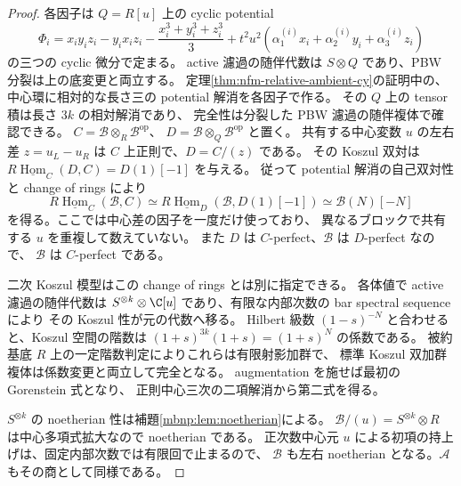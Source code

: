 \begin{proof}
各因子は $Q=R[u]$ 上の cyclic potential
\[
 \Phi_i=x_iy_iz_i-y_ix_iz_i
       -\frac{x_i^3+y_i^3+z_i^3}{3}
       +t^2u^2\left(\alpha^{(i)}_1x_i+
                     \alpha^{(i)}_2y_i+\alpha^{(i)}_3z_i\right)
\]
の三つの cyclic 微分で定まる。
active 濾過の随伴代数は $S\otimes Q$ であり、PBW 分裂は上の底変更と両立する。
定理\ref{thm:nfm-relative-ambient-cy}の証明中の、
中心環に相対的な長さ三の potential 解消を各因子で作る。
その $Q$ 上の tensor 積は長さ $3k$ の相対解消であり、
完全性は分裂した PBW 濾過の随伴複体で確認できる。
$C=\mathscr B\otimes_R\mathscr B^{\mathrm{op}}$、
$D=\mathscr B\otimes_Q\mathscr B^{\mathrm{op}}$ と置く。
共有する中心変数 $u$ の左右差 $z=u_L-u_R$ は $C$ 上正則で、$D=C/(z)$ である。
その Koszul 双対は
$R\underline{\operatorname{Hom}}_C(D,C)=D(1)[-1]$ を与える。
従って potential 解消の自己双対性と change of rings により
\[
 R\underline{\operatorname{Hom}}_C(\mathscr B,C)
 \simeq R\underline{\operatorname{Hom}}_D
              (\mathscr B,D(1)[-1])
 \simeq\mathscr B(N)[-N]
\]
を得る。ここでは中心差の因子を一度だけ使っており、
異なるブロックで共有する $u$ を重複して数えていない。
また $D$ は $C$-perfect、$\mathscr B$ は $D$-perfect なので、
$\mathscr B$ は $C$-perfect である。

二次 Koszul 模型はこの change of rings とは別に指定できる。
各体値で active 濾過の随伴代数は
$S^{\otimes k}\otimes\C[u]$ であり、有限な内部次数の bar spectral sequence により
その Koszul 性が元の代数へ移る。
Hilbert 級数 $(1-s)^{-N}$ と合わせると、Koszul 空間の階数は
$(1+s)^{3k}(1+s)=(1+s)^N$ の係数である。
被約基底 $R$ 上の一定階数判定によりこれらは有限射影加群で、
標準 Koszul 双加群複体は係数変更と両立して完全となる。
augmentation を施せば最初の Gorenstein 式となり、
正則中心三次の二項解消から第二式を得る。

$S^{\otimes k}$ の noetherian 性は補題\ref{mbnp:lem:noetherian}による。
$\mathscr B/(u)=S^{\otimes k}\otimes R$ は中心多項式拡大なので noetherian である。
正次数中心元 $u$ による初項の持上げは、固定内部次数では有限回で止まるので、
$\mathscr B$ も左右 noetherian となる。$\mathscr A$ もその商として同様である。


\end{proof}
